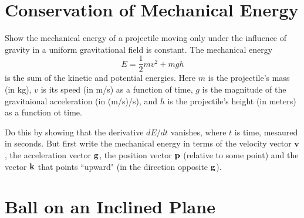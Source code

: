 \documentclass{ximera}
\begin{document}
\section{Conservation of Mechanical Energy}
\begin{question} \label{Q4re4r4rfefe}
Show the mechanical energy of a projectile moving only under the influence of gravity in a uniform gravitational field is constant. The mechanical energy
\[
   E = \frac{1}{2}mv^2 + mgh
\]
is the sum of the kinetic and potential energies. Here $m$ is the projectile's mass (in kg), $v$ is its speed (in m/s) as a function of time, $g$ is the magnitude of the gravitaional acceleration (in (m/s)/s), and $h$ is the projectile's height (in meters) as a function ot time. 

Do this by showing that the derivative $dE/dt$ vanishes, where $t$ is time, mesaured in seconds. But first write the mechanical energy in terms of the velocity vector ${\bf v}$, the acceleration vector ${\bf g}$, the position vector ${\bf p}$ (relative to some point) and the vector ${\bf k}$ that points ``upward" (in the direction opposite ${\bf g}$).
\end{question}



\section{Ball on an Inclined Plane}
\end{document}
